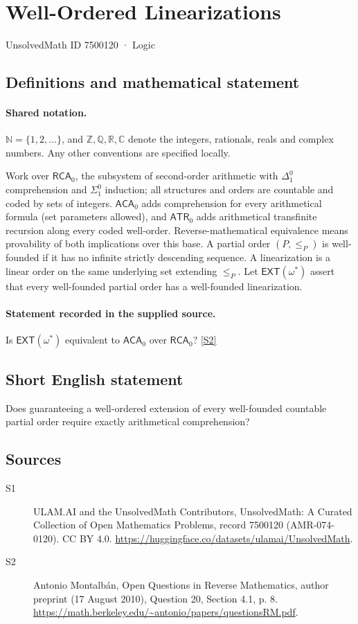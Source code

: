 \documentclass[11pt]{article}
\newcommand{\sref}[2]{\hyperlink{source:#1:#2}{[S#2]}}
\begin{document}
\setcounter{section}{7500119}
\section{Well-Ordered Linearizations}\label{7500120}
{\small\sffamily UnsolvedMath ID 7500120 · Logic}
\subsection{Definitions and mathematical statement}

\paragraph{Shared notation.}$\mathbb N=\{1,2,\ldots\}$, and $\mathbb Z,\mathbb Q,\mathbb R,\mathbb C$ denote the integers, rationals, reals and complex numbers. Any other conventions are specified locally.


Work over $\mathsf{RCA}_0$, the subsystem of second-order arithmetic with $\Delta^0_1$ comprehension and $\Sigma^0_1$ induction; all structures and orders are countable and coded by sets of integers. $\mathsf{ACA}_0$ adds comprehension for every arithmetical formula (set parameters allowed), and $\mathsf{ATR}_0$ adds arithmetical transfinite recursion along every coded well-order. Reverse-mathematical equivalence means provability of both implications over this base. A partial order $(P,\le_P)$ is well-founded if it has no infinite strictly descending sequence. A linearization is a linear order on the same underlying set extending $\le_P$. Let $\mathsf{EXT}(\omega^*)$ assert that every well-founded partial order has a well-founded linearization.
\paragraph{Statement recorded in the supplied source.}
Is $\mathsf{EXT}(\omega^*)$ equivalent to $\mathsf{ACA}_0$ over $\mathsf{RCA}_0$? \sref{7500120}{2}
\subsection{Short English statement}
Does guaranteeing a well-ordered extension of every well-founded countable partial order require exactly arithmetical comprehension?
\subsection{Sources}
\begin{description}
\item[\hypertarget{source:7500120:1}{S1}] ULAM.AI and the UnsolvedMath Contributors, UnsolvedMath: A Curated Collection of Open Mathematics Problems, record 7500120 (AMR-074-0120). CC BY 4.0. \url{https://huggingface.co/datasets/ulamai/UnsolvedMath}.
\item[\hypertarget{source:7500120:2}{S2}] Antonio Montalbán, Open Questions in Reverse Mathematics, author preprint (17 August 2010), Question 20, Section 4.1, p. 8. \url{https://math.berkeley.edu/~antonio/papers/questionsRM.pdf}.
\end{description}
\label{end:7500120}
\end{document}
